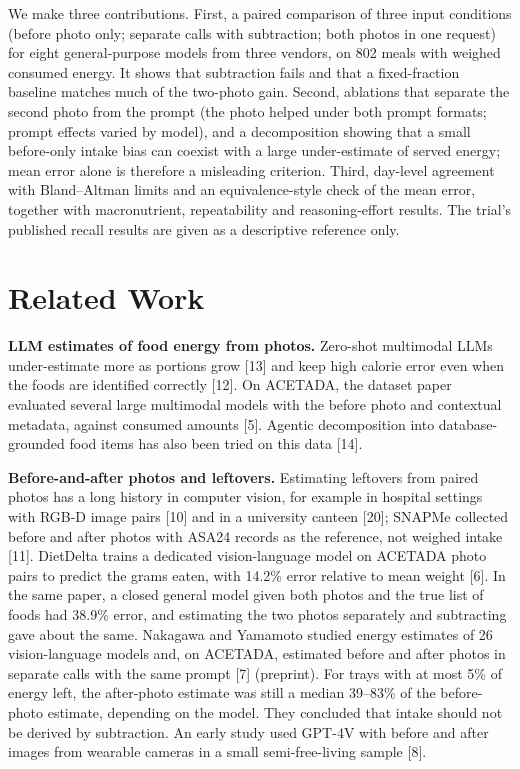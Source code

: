 \documentclass[
  11pt,
  letterpaper]{article}
\begin{document}
We make three contributions. First, a paired comparison of three input conditions (before photo only; separate
calls with subtraction; both photos in one request) for eight general-purpose models from three vendors, on
802 meals with weighed consumed energy. It shows that subtraction fails and that a fixed-fraction baseline
matches much of the two-photo gain. Second, ablations that separate the second photo from the prompt (the
photo helped under both prompt formats; prompt effects varied by model), and a decomposition showing that a
small before-only intake bias can coexist with a large under-estimate of served energy; mean error alone is
therefore a misleading criterion. Third, day-level agreement with Bland--Altman limits and an
equivalence-style check of the mean error, together with macronutrient, repeatability and reasoning-effort
results. The trial's published recall results are given as a descriptive reference only.

\section{Related Work}\label{related-work}

\textbf{LLM estimates of food energy from photos.} Zero-shot multimodal LLMs under-estimate more as portions
grow {[}13{]} and keep high calorie error even when the foods are identified correctly {[}12{]}. On ACETADA,
the dataset paper evaluated several large multimodal models with the before photo and contextual metadata,
against consumed amounts {[}5{]}. Agentic decomposition into database-grounded food items has also been tried
on this data {[}14{]}.

\textbf{Before-and-after photos and leftovers.} Estimating leftovers from paired photos has a long history in
computer vision, for example in hospital settings with RGB-D image pairs {[}10{]} and in a university canteen
{[}20{]}; SNAPMe collected before and after photos with ASA24 records as the reference, not weighed intake
{[}11{]}. DietDelta trains a dedicated vision-language model on ACETADA photo pairs to predict the grams
eaten, with 14.2\% error relative to mean weight {[}6{]}. In the same paper, a closed general model given both
photos and the true list of foods had 38.9\% error, and estimating the two photos separately and subtracting
gave about the same. Nakagawa and Yamamoto studied energy estimates of 26 vision-language models and, on
ACETADA, estimated before and after photos in separate calls with the same prompt {[}7{]} (preprint). For
trays with at most 5\% of energy left, the after-photo estimate was still a median 39--83\% of the
before-photo estimate, depending on the model. They concluded that intake should not be derived by
subtraction. An early study used GPT-4V with before and after images from wearable cameras in a small
semi-free-living sample {[}8{]}.
\end{document}
